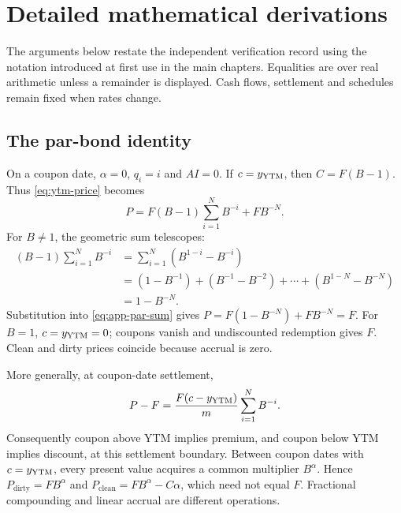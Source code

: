 \chapter{Detailed mathematical derivations}\label{app:derivations}
The arguments below restate the independent verification record using the notation introduced at first use in the main chapters. Equalities are over real arithmetic unless a remainder is displayed. Cash flows, settlement and schedules remain fixed when rates change.

\section{The par-bond identity}\label{sec:app-par}
On a coupon date, \(\alpha=0\), \(q_i=i\) and \(AI=0\). If \(c=y_{\mathrm{YTM}}\), then \(C=F(B-1)\). Thus \cref{eq:ytm-price} becomes
\begin{equation}\label{eq:app-par-sum}
P=F(B-1)\sum_{i=1}^N B^{-i}+FB^{-N}.
\end{equation}
For \(B\ne1\), the geometric sum telescopes:
\begin{align*}
(B-1)\sum_{i=1}^N B^{-i}
&=\sum_{i=1}^N(B^{1-i}-B^{-i})\\
&=(1-B^{-1})+(B^{-1}-B^{-2})+\cdots
 +(B^{1-N}-B^{-N})\\
&=1-B^{-N}.
\end{align*}
Substitution into \cref{eq:app-par-sum} gives \(P=F(1-B^{-N})+FB^{-N}=F\).
For \(B=1\), \(c=y_{\mathrm{YTM}}=0\); coupons vanish and undiscounted redemption gives \(F\). Clean and dirty prices coincide because accrual is zero.

More generally, at coupon-date settlement,
\begin{equation}\label{eq:app-premium}
P-F=\frac{F(c-y_{\mathrm{YTM}})}m\sum_{i=1}^N B^{-i}.
\end{equation}
Consequently coupon above YTM implies premium, and coupon below YTM implies discount, at this settlement boundary. Between coupon dates with \(c=y_{\mathrm{YTM}}\), every present value acquires a common multiplier \(B^\alpha\). Hence \(P_{\mathrm{dirty}}=FB^\alpha\) and \(P_{\mathrm{clean}}=FB^\alpha-C\alpha\), which need not equal \(F\). Fractional compounding and linear accrual are different operations.

